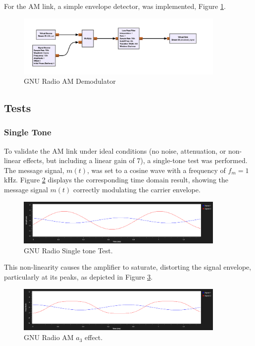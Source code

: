 For the AM link, a simple envelope detector, was implemented, Figure \ref{fig:gnu_am_demod}.

\begin{figure}[h]
    \centering
    \includegraphics*[width=0.9\textwidth]{images/GNU_am_demod.png}
    \caption{GNU Radio AM Demodulator}
    \label{fig:gnu_am_demod}
\end{figure}


\subsection{Tests}

\subsubsection{Single Tone}


To validate the AM link under ideal conditions (no noise, attenuation, or non-linear effects, but including a linear gain of 7), a single-tone test was performed. The message signal, $m(t)$, was set to a cosine wave with a frequency of $f_m = 1$ kHz. Figure \ref{fig:gnu_am_sig_tone} displays the corresponding time domain result, showing the message signal $m(t)$ correctly modulating the carrier envelope.

\begin{figure}[h]
    \centering
    \includegraphics*[width=0.9\textwidth]{images/GNU_AM_a3_0.png}
    \caption{GNU Radio Single tone Test.}
    \label{fig:gnu_am_sig_tone}
\end{figure}

This non-linearity causes the amplifier to saturate, distorting the signal envelope, particularly at its peaks, as depicted in Figure \ref{fig:gnu_am_a3_effect}.

\begin{figure}[h]
    \centering
    \includegraphics*[width=0.9\textwidth]{images/GNU_AM_a3.png}
    \caption{GNU Radio AM $a_3$ effect.}
    \label{fig:gnu_am_a3_effect}
\end{figure}

